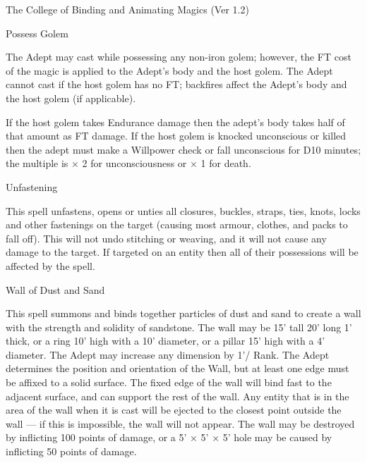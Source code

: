 \begin{Chapter}{The College of Binding and Animating Magics (Ver 1.2)}
\begin{spell}[S-10]{Possess Golem}
\begin{effects}
The Adept may cast while possessing any non-iron golem; however, the
FT cost of the magic is applied to the Adept’s body and the host
golem. The Adept cannot cast if the host golem has no FT; backfires
affect the Adept’s body and the host golem (if applicable).

If the host golem takes Endurance damage then the adept’s body takes
half of that amount as FT damage.  If the host golem is knocked
unconscious or killed then the adept must make a Willpower check or
fall unconscious for D10 minutes; the multiple is × 2 for
unconsciousness or × 1 for death.
\end{effects}
\end{spell}

\begin{spell}[S-11]{Unfastening}
\begin{effects}
This spell unfastens, opens or unties all closures, buckles, straps,
ties, knots, locks and other fastenings on the target (causing most
armour, clothes, and packs to fall off). This will not undo stitching
or weaving, and it will not cause any damage to the target.  If
targeted on an entity then all of their possessions will be affected
by the spell.
\end{effects}
\end{spell}

\begin{spell}[S-12]{Wall of Dust and Sand}
\begin{effects}
This spell summons and binds together particles of dust and sand to
create a wall with the strength and solidity of sandstone. The wall
may be 15’ tall 20’ long 1’ thick, or a ring 10’ high with a 10’
diameter, or a pillar 15’ high with a 4’ diameter.  The Adept may
increase any dimension by 1’/ Rank.  The Adept determines the position
and orientation of the Wall, but at least one edge must be affixed to
a solid surface.  The fixed edge of the wall will bind fast to the
adjacent surface, and can support the rest of the wall. Any entity
that is in the area of the wall when it is cast will be ejected to the
closest point outside the wall --- if this is impossible, the wall
will not appear. The wall may be destroyed by inflicting 100 points of
damage, or a 5’ × 5’ × 5’ hole may be caused by inflicting 50 points
of damage.
\end{effects}
\end{spell}


\end{Chapter}
